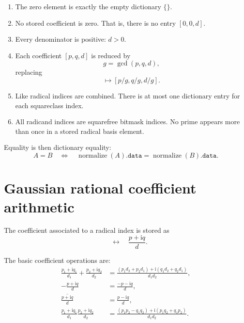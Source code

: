 \documentclass[11pt]{article}
\newcommand{\ii}{\mathrm{i}}
\begin{document}
\begin{enumerate}[label=\textbf{N\arabic*.}]
  \item The zero element is exactly the empty dictionary \(\{\}\).
  \item No stored coefficient is zero. That is, there is no entry \([0,0,d]\).
  \item Every denominator is positive: \(d>0\).
  \item Each coefficient \([p,q,d]\) is reduced by
  \begin{equation}
    g = \gcd(p,q,d),
  \end{equation}
  replacing
  \begin{equation}
    [p,q,d] \mapsto [p/g,q/g,d/g].
  \end{equation}
  \item Like radical indices are combined. There is at most one dictionary entry for each squareclass index.
  \item All radicand indices are squarefree bitmask indices. No prime appears more than once in a stored radical basis element.
\end{enumerate}

Equality is then dictionary equality:
\begin{equation}
  A=B \quad\Longleftrightarrow\quad \operatorname{normalize}(A).\texttt{data}=\operatorname{normalize}(B).\texttt{data}.
\end{equation}

\section{Gaussian rational coefficient arithmetic}

The coefficient associated to a radical index is stored as
\begin{equation}
  [p,q,d] \quad\leftrightarrow\quad \frac{p+\ii q}{d}.
\end{equation}

The basic coefficient operations are:
\begin{align*}
  \frac{p_1+\ii q_1}{d_1} + \frac{p_2+\ii q_2}{d_2}
  &= \frac{(p_1d_2+p_2d_1)+\ii(q_1d_2+q_2d_1)}{d_1d_2},\\
  -\frac{p+\ii q}{d}
  &=\frac{-p-\ii q}{d},\\
  \overline{\frac{p+\ii q}{d}}
  &=\frac{p-\ii q}{d},\\
  \frac{p_1+\ii q_1}{d_1}\frac{p_2+\ii q_2}{d_2}
  &=\frac{(p_1p_2-q_1q_2)+\ii(p_1q_2+q_1p_2)}{d_1d_2}.
\end{align*}
\end{document}
